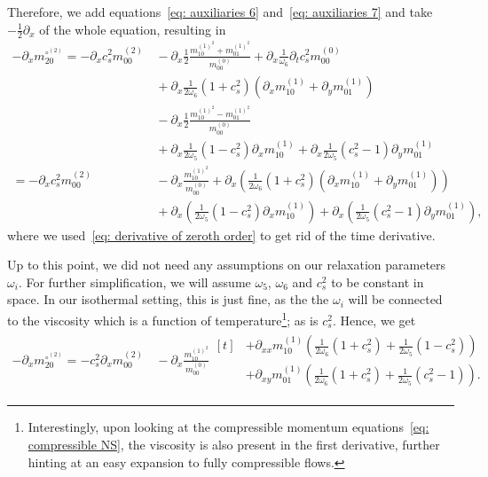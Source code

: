 Therefore, we add equations~\eqref{eq: auxiliaries 6} and~\eqref{eq: auxiliaries 7} and take $-\frac{1}{2}\partial_x$ of the whole equation, resulting in
\begin{align}
  -\partial_x m_{20}^{\circ^{(2)}}
  =
  - \partial_x c_s^2 m_{00}^{(2)}
  &\,
  - \partial_x\frac{1}{2}\frac{ m_{10}^{{(1)}^2} + m_{01}^{{(1)}^2}}{m_{00}^{(0)}}
  + \partial_x\frac{1}{\omega_6}\partial_t c_s^2 m_{00}^{(0)}
  \nonumber
  \\&\,
  + \partial_x\frac{1}{2\omega_6}(1+c_s^2)(\partial_x m_{10}^{(1)} + \partial_y m_{01}^{(1)})
  \nonumber
  \\&\,
  - \partial_x\frac{1}{2}\frac{ m_{10}^{{(1)}^2} - m_{01}^{{(1)}^2}}{m_{00}^{(0)}}
  \nonumber
  \\&\,
  + \partial_x\frac{1}{2\omega_5} (1 - c_s^2)\partial_x m_{10}^{(1)}
  + \partial_x\frac{1}{2\omega_5} (c_s^2 - 1)\partial_y m_{01}^{(1)}
  \nonumber
  \\
  =
  - \partial_x c_s^2 m_{00}^{(2)}
  &\,
  - \partial_x\frac{ m_{10}^{{(1)}^2} }{m_{00}^{(0)}}
  + \partial_x\left(\frac{1}{2\omega_6}(1+c_s^2)(\partial_x m_{10}^{(1)} + \partial_y m_{01}^{(1)})\right)
  \nonumber
  \\&\,
  \nonumber
  + \partial_x\left(\frac{1}{2\omega_5} (1 - c_s^2)\partial_x m_{10}^{(1)}\right)
  + \partial_x\left(\frac{1}{2\omega_5} (c_s^2 - 1)\partial_y m_{01}^{(1)}\right),
\end{align}
where we used~\eqref{eq: derivative of zeroth order} to get rid of the time derivative.

Up to this point, we did not need any assumptions on our relaxation parameters $\omega_i$.
For further simplification, we will assume $\omega_5$, $\omega_6$ and $c_s^2$ to be constant in space.
In our isothermal setting, this is just fine, as the the $\omega_i$ will be connected to the viscosity which is a function of temperature\footnote{Interestingly,
upon looking at the compressible momentum equations~\eqref{eq: compressible NS}, the viscosity is also present in the first derivative, further hinting at an easy expansion to fully compressible flows.
}; as is $c_s^2$.
Hence, we get
\begin{align}
  \label{eq: auxiliaries 9}
  -\partial_x m_{20}^{\circ^{(2)}}
  =
  - c_s^2 \partial_x  m_{00}^{(2)}
  &\,
  - \partial_x\frac{ m_{10}^{{(1)}^2} }{m_{00}^{(0)}}
  \begin{aligned}[t]
    &+ \partial_{xx} m_{10}^{(1)} \left(\frac{1}{2\omega_6}(1+c_s^2) + \frac{1}{2\omega_5} (1 - c_s^2)\right)
    \\&
    + \partial_{xy} m_{01}^{(1)} \left(\frac{1}{2\omega_6}(1+c_s^2) + \frac{1}{2\omega_5} (c_s^2 - 1)\right).
  \end{aligned}
\end{align}

